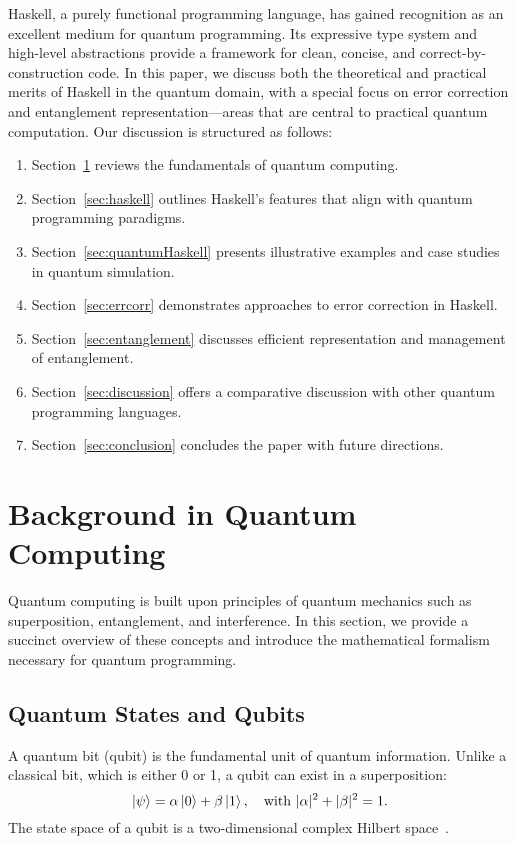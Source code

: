 \documentclass[12pt]{article}
\begin{document}
Haskell, a purely functional programming language, has gained recognition as an excellent medium for quantum programming. Its expressive type system and high-level abstractions provide a framework for clean, concise, and correct-by-construction code. In this paper, we discuss both the theoretical and practical merits of Haskell in the quantum domain, with a special focus on error correction and entanglement representation---areas that are central to practical quantum computation. Our discussion is structured as follows:
\begin{enumerate}
    \item Section~\ref{sec:background} reviews the fundamentals of quantum computing.
    \item Section~\ref{sec:haskell} outlines Haskell's features that align with quantum programming paradigms.
    \item Section~\ref{sec:quantumHaskell} presents illustrative examples and case studies in quantum simulation.
    \item Section~\ref{sec:errcorr} demonstrates approaches to error correction in Haskell.
    \item Section~\ref{sec:entanglement} discusses efficient representation and management of entanglement.
    \item Section~\ref{sec:discussion} offers a comparative discussion with other quantum programming languages.
    \item Section~\ref{sec:conclusion} concludes the paper with future directions.
\end{enumerate}

\section{Background in Quantum Computing}
\label{sec:background}
Quantum computing is built upon principles of quantum mechanics such as superposition, entanglement, and interference. In this section, we provide a succinct overview of these concepts and introduce the mathematical formalism necessary for quantum programming.

\subsection{Quantum States and Qubits}
A quantum bit (qubit) is the fundamental unit of quantum information. Unlike a classical bit, which is either 0 or 1, a qubit can exist in a superposition:
\[
\ket{\psi} = \alpha \ket{0} + \beta \ket{1}, \quad \text{with } |\alpha|^2 + |\beta|^2 = 1.
\]
The state space of a qubit is a two-dimensional complex Hilbert space~\cite{nielsen2000quantum}.
\end{document}

